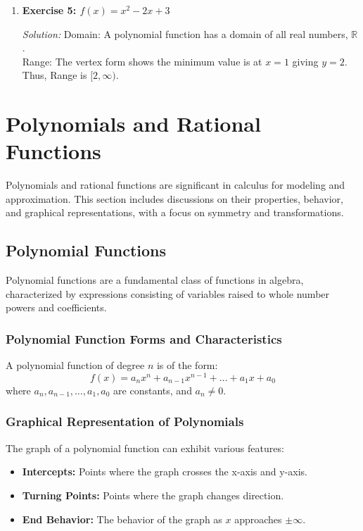 \documentclass[a4paper,12pt]{book}
\newenvironment{solution}[1][]
{\par\noindent\textit{Solution:} \rmfamily}{\medskip}
\begin{document}
\begin{enumerate}
    \item \textbf{Exercise 5: \( f(x) = x^2 - 2x + 3 \)}
    \begin{solution}
    Domain: A polynomial function has a domain of all real numbers, \( \mathbb{R} \).\\
    Range: The vertex form shows the minimum value is at \( x = 1 \) giving \( y = 2 \). Thus, Range is \( [2, \infty) \).
    \end{solution}
\end{enumerate}


\section{Polynomials and Rational Functions}
\label{sec:polynomials_and_rational}
Polynomials and rational functions are significant in calculus for modeling and approximation. This section includes discussions on their properties, behavior, and graphical representations, with a focus on symmetry and transformations.

\subsection{Polynomial Functions}
\label{subsec:polynomial_functions}
Polynomial functions are a fundamental class of functions in algebra, characterized by expressions consisting of variables raised to whole number powers and coefficients.

\subsubsection{Polynomial Function Forms and Characteristics}
A polynomial function of degree \( n \) is of the form:
\[ f(x) = a_nx^n + a_{n-1}x^{n-1} + \ldots + a_1x + a_0 \]
where \( a_n, a_{n-1}, \ldots, a_1, a_0 \) are constants, and \( a_n \neq 0 \).

\subsubsection{Graphical Representation of Polynomials}
The graph of a polynomial function can exhibit various features:
\begin{itemize}
    \item \textbf{Intercepts:} Points where the graph crosses the x-axis and y-axis.
    \item \textbf{Turning Points:} Points where the graph changes direction.
    \item \textbf{End Behavior:} The behavior of the graph as \( x \) approaches \( \pm \infty \).
\end{itemize}
\end{document}
